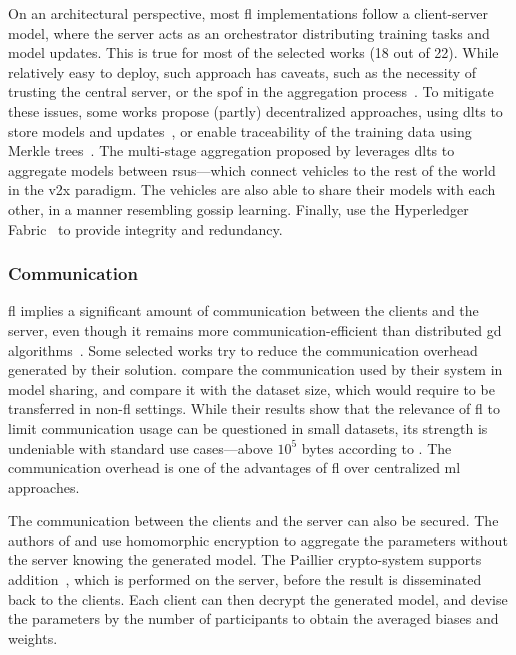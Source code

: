 On an architectural perspective, most \gls{fl} implementations follow a client-server model, where the server acts as an orchestrator distributing training tasks and model updates.
This is true for most of the selected works (18 out of 22).
While relatively easy to deploy, such approach has caveats, such as the necessity of trusting the central server, or the \gls{spof} in the aggregation process~\cite{aledhari_FederatedLearningSurvey_2020}.
To mitigate these issues, some works propose (partly) decentralized approaches, using \glspl{dlt} to store models and updates~\cite{rathore_BlockSecIoTNetBlockchainbaseddecentralized_2019}, or enable traceability of the training data using Merkle trees~\cite{zhang_BlockchainbasedFederatedLearning_2020}.
The multi-stage aggregation proposed by \textcite{liu_BlockchainFederatedLearning_2021} leverages \glspl{dlt} to aggregate models between \glspl{rsu}---which connect vehicles to the rest of the world in the \gls{v2x} paradigm.
The vehicles are also able to share their models with each other, in a manner resembling gossip learning.
Finally, \textcite{hei_trustedfeatureaggregator_2020} use the Hyperledger Fabric~\cite{androulaki_HyperledgerFabricDistributed_2018} to provide integrity and redundancy.


\subsubsection{Communication\label{sec:sota.quali.comm}}

\Gls{fl} implies a significant amount of communication between the clients and the server, even though it remains more communication-efficient than distributed \gls{gd} algorithms~\cite{mcmahan_Communicationefficientlearningdeep_2017}.
Some selected works try to reduce the communication overhead generated by their solution.
\textcite{schneble_Attackdetectionusing_2019,zhang_BlockchainbasedFederatedLearning_2020} compare the communication used by their system in model sharing, and compare it with the dataset size, which would require to be transferred in non-\gls{fl} settings.
While their results show that the relevance of \gls{fl} to limit communication usage can be questioned in small datasets, its strength is undeniable with standard use cases---above \(10^5\) bytes according to \cite{zhang_BlockchainbasedFederatedLearning_2020}.
The communication overhead is one of the advantages of \gls{fl} over centralized \gls{ml} approaches.

The communication between the clients and the server can also be secured.
The authors of \cite{li_DeepFedFederatedDeep_2020} and \cite{li_DistributedNetworkIntrusion_2020} use homomorphic encryption to aggregate the parameters without the server knowing the generated model.
The Paillier crypto-system supports addition~\cite{paillier_PublicKeyCryptosystemsBased_1999}, which is performed on the server, before the result is disseminated back to the clients.
Each client can then decrypt the generated model, and devise the parameters by the number of participants to obtain the averaged biases and weights.


